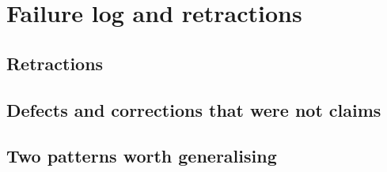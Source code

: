 \section{Failure log and retractions}
\label{sec:failures}

\subsection{Retractions}

\subsection{Defects and corrections that were not claims}

\subsection{Two patterns worth generalising}

